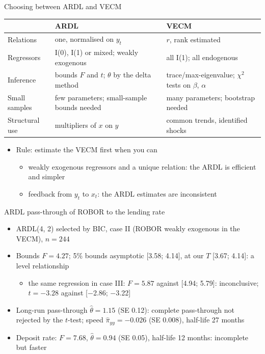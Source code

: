 \begin{frame}{Choosing between ARDL and VECM}
\itemsize{\small}
\begin{center}
\scriptsize
\begin{tabular}{>{\raggedright\arraybackslash}p{3.0cm}>{\raggedright\arraybackslash}p{4.4cm}>{\raggedright\arraybackslash}p{4.4cm}}
\toprule
 & \textbf{ARDL} & \textbf{VECM} \\
\midrule
Relations & one, normalised on $y_t$ & $r$, rank estimated \\
Regressors & I(0), I(1) or mixed; weakly exogenous & all I(1); all endogenous \\
Inference & bounds $F$ and $t$; $\theta$ by the delta method & trace/max-eigenvalue; $\chi^2$ tests on $\beta$, $\alpha$ \\
Small samples & few parameters; small-sample bounds needed & many parameters; bootstrap needed \\
Structural use & multipliers of $x$ on $y$ & common trends, identified shocks \\
\bottomrule
\end{tabular}
\end{center}
\begin{itemize}
    \item Rule: estimate the VECM first when you can
    \begin{itemize}
        \item weakly exogenous regressors and a unique relation: the ARDL is efficient and simpler
        \item feedback from $y_t$ to $x_t$: the ARDL estimates are inconsistent
    \end{itemize}
\end{itemize}
\end{frame}

\begin{frame}{ARDL pass-through of ROBOR to the lending rate}
\itemsize{\small}
\begin{itemize}
    \item ARDL(4, 2) selected by BIC, case II (ROBOR weakly exogenous in the VECM), $n = 244$
    \item Bounds $F = 4.27$; 5\% bounds asymptotic [3.58; 4.14], at our $T$ [3.67; 4.14]: a level relationship
    \begin{itemize}
        \item the same regression in case III: $F = 5.87$ against [4.94; 5.79]: inconclusive; $t = \ensuremath{-}3.28$ against [\ensuremath{-}2.86; \ensuremath{-}3.22]
    \end{itemize}
    \item Long-run pass-through $\hat\theta = 1.15$ (SE 0.12): complete pass-through not rejected by the $t$-test; speed $\hat\pi_{yy} = \ensuremath{-}0.026$ (SE 0.008), half-life 27 months
    \item Deposit rate: $F = 7.68$, $\hat\theta = 0.94$ (SE 0.05), half-life 12 months: incomplete but faster
\end{itemize}
\end{frame}

